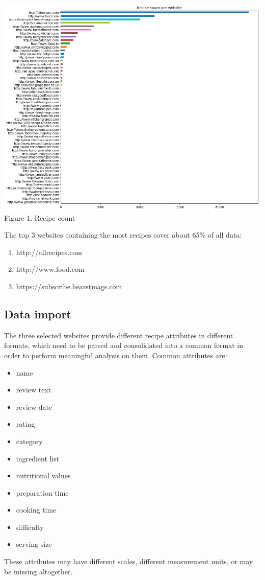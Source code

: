 \documentclass[11pt]{article}
\begin{document}
\vspace{5mm}
\begin{center}
\includegraphics[scale=0.22]{website-count}
\label{website-count} Figure 1. Recipe count
\end{center}
\vspace{5mm}

The top 3 websites containing the most recipes cover about 65\% of all data: 
\begin{enumerate}
\item http://allrecipes.com
\item http://www.food.com
\item https://subscribe.hearstmags.com
\end{enumerate}

\subsection{Data import}

The three selected websites provide different recipe attributes in different formats, which need to be parsed and consolidated into a common format in order to perform meaningful analysis on them.
Common attributes are:
\begin{itemize}
    \item name
    \item review text
    \item review date
    \item rating
    \item category
    \item ingredient list
    \item nutritional values
    \item preparation time
    \item cooking time
    \item difficulty
    \item serving size
\end{itemize}
These attributes may have different scales, different measurement units, or may be missing altogether. 
\end{document}
